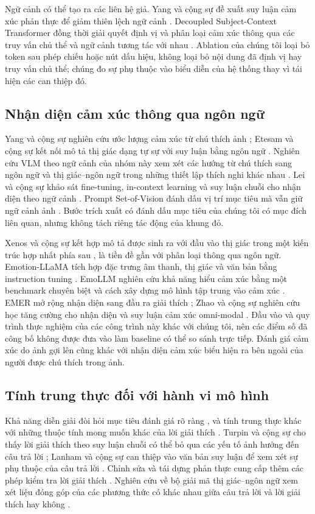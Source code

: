 \documentclass[conference]{IEEEtran}
\begin{document}
Ngữ cảnh có thể tạo ra các liên hệ giả. Yang và cộng sự đề xuất suy luận cảm xúc phản thực để giảm thiên lệch ngữ cảnh \cite{debias}. Decoupled Subject-Context Transformer đồng thời giải quyết định vị và phân loại cảm xúc thông qua các truy vấn chủ thể và ngữ cảnh tương tác với nhau \cite{decoupled}. Ablation của chúng tôi loại bỏ token sau phép chiếu hoặc nút dấu hiệu, không loại bỏ nội dung đã định vị hay truy vấn chủ thể; chúng đo sự phụ thuộc vào biểu diễn của hệ thống thay vì tái hiện các can thiệp đó.

\subsection{Nhận diện cảm xúc thông qua ngôn ngữ}
Yang và cộng sự nghiên cứu ước lượng cảm xúc từ chú thích ảnh \cite{captions}; Etesam và cộng sự kết nối mô tả thị giác dạng tự sự với suy luận bằng ngôn ngữ \cite{etom}. Nghiên cứu VLM theo ngữ cảnh của nhóm này xem xét các hướng từ chú thích sang ngôn ngữ và thị giác--ngôn ngữ trong những thiết lập thích nghi khác nhau \cite{contextvlm}. Lei và cộng sự khảo sát fine-tuning, in-context learning và suy luận chuỗi cho nhận diện theo ngữ cảnh \cite{lei}. Prompt Set-of-Vision đánh dấu vị trí mục tiêu mà vẫn giữ ngữ cảnh ảnh \cite{visualprompt}. Bước trích xuất có đánh dấu mục tiêu của chúng tôi có mục đích liên quan, nhưng không tách riêng tác động của khung đỏ.

Xenos và cộng sự kết hợp mô tả được sinh ra với đầu vào thị giác trong một kiến trúc hợp nhất phía sau \cite{commonsense}, là tiền đề gần với phân loại thông qua ngôn ngữ. Emotion-LLaMA tích hợp đặc trưng âm thanh, thị giác và văn bản bằng instruction tuning \cite{emotionllama}. EmoLLM nghiên cứu khả năng hiểu cảm xúc bằng một benchmark chuyên biệt và cách xây dựng mô hình tập trung vào cảm xúc \cite{emollm}. EMER mở rộng nhận diện sang đầu ra giải thích \cite{emer}; Zhao và cộng sự nghiên cứu học tăng cường cho nhận diện và suy luận cảm xúc omni-modal \cite{r1omni}. Đầu vào và quy trình thực nghiệm của các công trình này khác với chúng tôi, nên các điểm số đã công bố không được đưa vào làm baseline có thể so sánh trực tiếp. Đánh giá cảm xúc do ảnh gợi lên \cite{evaluatevlm} cũng khác với nhận diện cảm xúc biểu hiện ra bên ngoài của người được chú thích trong ảnh.

\subsection{Tính trung thực đối với hành vi mô hình}
Khả năng diễn giải đòi hỏi mục tiêu đánh giá rõ ràng \cite{interpretability}, và tính trung thực khác với những thuộc tính mong muốn khác của lời giải thích \cite{faithfulness}. Turpin và cộng sự cho thấy lời giải thích theo suy luận chuỗi có thể bỏ qua các yếu tố ảnh hưởng đến câu trả lời \cite{turpin}; Lanham và cộng sự can thiệp vào văn bản suy luận để xem xét sự phụ thuộc của câu trả lời \cite{lanham}. Chỉnh sửa và tái dựng phản thực cung cấp thêm các phép kiểm tra lời giải thích \cite{faithfulnesstests}. Nghiên cứu về bộ giải mã thị giác--ngôn ngữ xem xét liệu đóng góp của các phương thức có khác nhau giữa câu trả lời và lời giải thích hay không \cite{decoderfaithfulness}.
\end{document}

